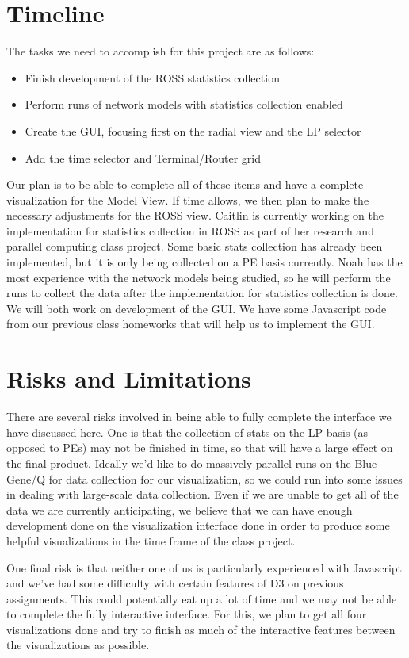 \documentclass{acm_proc_article-sp}
\begin{document}
\section{Timeline}
The tasks we need to accomplish for this project are as follows:
\begin{itemize}
\item Finish development of the ROSS statistics collection
\item Perform runs of network models with statistics collection enabled
\item Create the GUI, focusing first on the radial view and the LP selector
\item Add the time selector and Terminal/Router grid
\end{itemize}

Our plan is to be able to complete all of these items and have a complete visualization for the Model View.  If time allows, we then plan to make the necessary adjustments for the ROSS view.  Caitlin is currently working on the implementation for statistics collection in ROSS as part of her research and parallel computing class project.  Some basic stats collection has already been implemented, but it is only being collected on a PE basis currently.  Noah has the most experience with the network models being studied, so he will perform the runs to collect the data after the implementation for statistics collection is done.  We will both work on development of the GUI.  We have some Javascript code from our previous class homeworks that will help us to implement the GUI.  

\section{Risks and Limitations}
There are several risks involved in being able to fully complete the interface we have discussed here.  One is that the collection of stats on the LP basis (as opposed to PEs) may not be finished in time, so that will have a large effect on the final product.  Ideally we'd like to do massively parallel runs on the Blue Gene/Q for data collection for our visualization, so we could run into some issues in dealing with large-scale data collection.  Even if we are unable to get all of the data we are currently anticipating, we believe that we can have enough development done on the visualization interface done in order to produce some helpful visualizations in the time frame of the class project.

One final risk is that neither one of us is particularly experienced with Javascript and we've had some difficulty with certain features of D3 on previous assignments.   This could potentially eat up a lot of time and we may not be able to complete the fully interactive interface.  For this, we plan to get all four visualizations done and try to finish as much of the interactive features between the visualizations as possible.  
    
\end{document}
